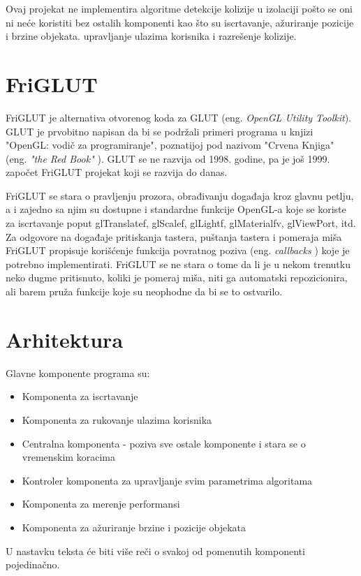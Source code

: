 \documentclass[12pt,oneside]{memoir}
\begin{document}
Ovaj projekat ne implementira algoritme detekcije kolizije u izolaciji pošto 
se oni ni neće koristiti bez ostalih komponenti kao što su iscrtavanje, ažuriranje pozicije i brzine objekata.
upravljanje ulazima korisnika i razrešenje kolizije.

\section{FriGLUT}

FriGLUT je alternativa otvorenog koda za GLUT (eng. {\em OpenGL Utility Toolkit}). 
GLUT je prvobitno napisan da bi se podržali primeri programa u knjizi "OpenGL:
vodič za programiranje", poznatijoj pod nazivom "Crvena Knjiga" (eng. {\em "the Red Book" }).
GLUT se ne razvija od 1998. godine, pa je još 1999. započet FriGLUT projekat koji 
se razvija do danas. 
\cite{freeglut}

FriGLUT se stara o pravljenju prozora, obrađivanju događaja kroz glavnu petlju,
a i zajedno sa njim su dostupne i standardne funkcije OpenGL-a koje se koriste
za iscrtavanje poput glTranslatef, glScalef, glLightf, glMaterialfv, glViewPort, itd.
Za odgovore na događaje pritiskanja tastera, puštanja tastera i pomeraja miša
FriGLUT propisuje korišćenje funkcija povratnog poziva  (eng. {\em callbacks }) koje je potrebno implementirati.
FriGLUT se ne stara o tome da li je u nekom trenutku neko dugme pritisnuto, 
koliki je pomeraj miša, niti ga automatski repozicionira, ali barem pruža 
funkcije koje su neophodne da bi se to ostvarilo.

\section{Arhitektura}

Glavne komponente programa su:
\begin{itemize}
	\item Komponenta za iscrtavanje
	\item Komponenta za rukovanje ulazima korisnika
	\item Centralna komponenta - poziva sve ostale komponente i stara se o vremenskim koracima
	\item Kontroler komponenta za upravljanje svim parametrima algoritama
	\item Komponenta za merenje performansi
	\item Komponenta za ažuriranje brzine i pozicije objekata
\end{itemize}

U nastavku teksta će biti više reči o svakoj od pomenutih komponenti pojedinačno.
\end{document}

